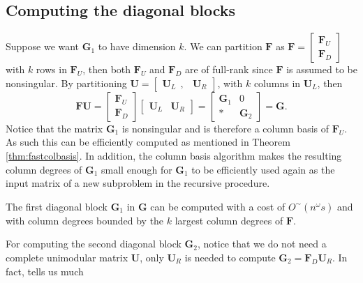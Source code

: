 \subsection{Computing the diagonal blocks}

Suppose we want $\mathbf{G}_{1}$ to have dimension $k$. We can partition\textbf{
$\mathbf{F}$ }as $\mathbf{F}=\begin{bmatrix}\mathbf{F}_{U}\\
\mathbf{F}_{D}
\end{bmatrix}$ with $k$ rows in $\mathbf{F}_{U}$, then both $\mathbf{F}_{U}$
and $\mathbf{F}_{D}$ are of full-rank since $\mathbf{F}$ is assumed
to be nonsingular. By partitioning $\mathbf{U}=\begin{bmatrix}\mathbf{U}_{L}~~, & \mathbf{U}_{R}\end{bmatrix}$,
with $k$ columns in $\mathbf{U}_{L}$, then 
\begin{equation}
\mathbf{F}\mathbf{U}=\begin{bmatrix}\mathbf{F}_{U}\\
\mathbf{F}_{D}
\end{bmatrix}\begin{bmatrix}\mathbf{U}_{L} & \mathbf{U}_{R}\end{bmatrix}=\begin{bmatrix}\mathbf{G}_{1} & 0\\
* & \mathbf{G}_{2}
\end{bmatrix}=\mathbf{G}.\label{eq:UPartitioned}
\end{equation}
 Notice that the matrix $\mathbf{G}_{1}$ is nonsingular and is therefore
a column basis of $\mathbf{F}_{U}$. As such this can be efficiently
computed %
as mentioned in Theorem \ref{thm:fastcolbasis}. In addition, the
column basis algorithm makes the resulting column degrees of $\mathbf{G}_{1}$
small enough for $\mathbf{G}_{1}$ to be efficiently used again as
the input matrix of a new subproblem in the recursive procedure.
\begin{lem}
\label{lem:firstDiagonalBlock}The first diagonal block $\mathbf{G}_{1}$
in $\mathbf{G}$ can be computed with a cost of $O^{\sim}\left(n^{\omega}s\right)$
and with column degrees bounded by the $k$ largest column degrees
of $\mathbf{F}$.
\end{lem}
For computing the second diagonal block $\mathbf{G}_{2}$, notice
that we do not need a complete unimodular matrix $\mathbf{U}$, only
$\mathbf{U}_{R}$ is needed to compute $\mathbf{G}_{2}=\mathbf{F}_{D}\mathbf{U}_{R}$.
In fact,  tells us much
